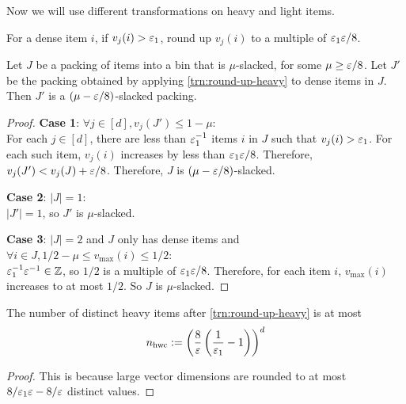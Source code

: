 Now we will use different transformations on heavy and light items.

\begin{transformation}
\label{trn:round-up-heavy}
For a dense item $i$, if $v_j(i) > \varepsilon_1$, round up $v_j(i)$ to a multiple of $\varepsilon_1\varepsilon/8$.
\end{transformation}
\begin{lemma}
\label{lem:round-up-heavy}
Let $J$ be a packing of items into a bin that is $\mu$-slacked, for some $\mu \ge \varepsilon/8$.
Let $J'$ be the packing obtained by applying \cref{trn:round-up-heavy}
to dense items in $J$. Then $J'$ is a $(\mu-\varepsilon/8)$-slacked packing.
\end{lemma}
\begin{proof}
\textbf{Case 1}: $\forall j \in [d], v_j(J') \le 1-\mu$:\\
For each $j \in [d]$, there are less than $\varepsilon_1^{-1}$ items $i$ in $J$
such that $v_j(i) > \varepsilon_1$. For each such item, $v_j(i)$ increases by less than $\varepsilon_1\varepsilon/8$.
Therefore, $v_j(J') < v_j(J) + \varepsilon/8$. Therefore, $J$ is $(\mu - \varepsilon/8)$-slacked.

\textbf{Case 2}: $|J| = 1$:\\
$|J'|=1$, so $J'$ is $\mu$-slacked.

\textbf{Case 3}: $|J| = 2$ and $J$ only has dense items
and $\forall i \in J, 1/2 - \mu \le v_{\max}(i) \le 1/2$:\\
$\varepsilon_1^{-1}\varepsilon^{-1} \in \mathbb{Z}$, so $1/2$ is a multiple of $\varepsilon_1\varepsilon/8$.
Therefore, for each item $i$, $v_{\max}(i)$ increases to at most $1/2$.
So $J$ is $\mu$-slacked.
\end{proof}

\begin{lemma}
\label{lem:round-up-heavy-n}
The number of distinct heavy items after \cref{trn:round-up-heavy} is at most
\[ n_{\mathrm{hwc}} := \left(\frac{8}{\varepsilon}\left(\frac{1}{\varepsilon_1}-1\right)\right)^d \]
\end{lemma}
\begin{proof}
This is because large vector dimensions are rounded to at most
$8/\varepsilon_1\varepsilon - 8/\varepsilon$ distinct values.
\end{proof}

